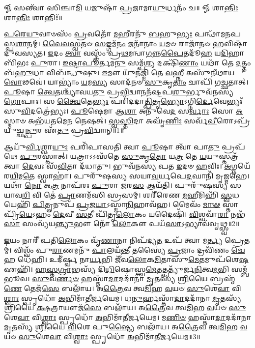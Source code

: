 \setcounter{anuvakam}{0}
𑍐 𑌸𑌨𑍍𑌤𑍍𑌵𑌾᳴ 𑌸𑌿𑌞𑍍𑌚𑌾\-\ul{𑌮𑌿} 𑌯𑌜𑍁𑌷𑌾᳴ \ul{𑌪𑍍𑌰}\-𑌜𑌾𑌮𑌾\-\ul{𑌯𑍁}\-𑌰𑍍𑌧𑌨𑌂᳴ 𑌚॥ 𑍐 𑌶𑌾\-\ul{𑌨𑍍𑌤𑌿𑌃} 𑌶𑌾\-\ul{𑌨𑍍𑌤𑌿𑌃} 𑌶𑌾𑌨𑍍𑌤𑌿𑌃᳴॥

\-\ul{𑌪}\-\-\ul{𑌰𑍇}\-\-\ul{𑌯𑍁}\-𑌵𑌾𑍞𑌸𑌂᳴ \ul{𑌪𑍍𑌰}\-𑌵𑌤𑍋᳴ \ul{𑌮}\-𑌹𑍀𑌰𑌨𑍁᳴ \ul{𑌬}\-𑌹𑍁\-\ul{𑌭𑍍𑌯𑌃} 𑌪𑌨𑍍𑌥𑌾᳴𑌮𑌨𑌪𑌸𑍍𑌪\-\ul{𑌶𑌾}\-𑌨𑌮𑍍। 
\-\ul{𑌵𑍈}\-\-\ul{𑌵}\-\-\ul{𑌸𑍍𑌵}\-𑌤𑍞 \ul{𑌸}\-𑌙𑍍𑌗𑌮᳴\-\ul{𑌨𑌂} 𑌜𑌨𑌾᳴𑌨𑌾𑌂 \ul{𑌯}\-𑌮𑍞 𑌰𑌾𑌜𑌾᳴𑌨𑍞 \ul{𑌹}\-𑌵𑌿𑌷𑌾᳴ 𑌦𑍁𑌵𑌸𑍍𑌯𑌤। 
\-\ul{𑌇}\-𑌦𑌂 \ul{𑌤𑍍𑌵𑌾} 𑌵𑌸𑍍𑌤𑍍𑌰𑌂᳴ 𑌪𑍍𑌰\-\ul{𑌥}\-𑌮𑌨𑍍𑌵𑌾\-\ul{𑌗}\-𑌨𑍍𑌨\-\ul{𑌪𑍈}\-𑌤𑌦𑍂᳴\-\ul{𑌹} 𑌯\-\ul{𑌦𑌿}\-𑌹𑌾𑌬𑌿᳴𑌭𑌃 \ul{𑌪𑍁}\-𑌰𑌾। 
\-\ul{𑌇}\-\-\ul{𑌷𑍍𑌟𑌾}\-\-\ul{𑌪𑍂}\-𑌰𑍍𑌤𑌮\-\ul{𑌨𑍁} 𑌸𑌮𑍍𑌪᳴\-\ul{𑌶𑍍𑌯} 𑌦𑌕𑍍𑌷𑌿᳴\-\ul{𑌣𑌾𑌂} 𑌯𑌥𑌾᳴ 𑌤𑍇 \ul{𑌦}\-𑌤𑍍𑌤𑌂 𑌬᳴\-\ul{𑌹𑍁}\-𑌧𑌾 𑌵𑌿𑌬᳴𑌨𑍍𑌧𑍁𑌷𑍁। 
\-\ul{𑌇}\-𑌮𑍗 𑌯𑍁᳴𑌨𑌜𑍍𑌮𑌿 𑌤𑍇 \ul{𑌵}\-𑌹𑍍𑌨𑍀 𑌅𑌸𑍁᳴𑌨𑍀𑌥𑌾𑌯 \ul{𑌵𑍋}\-𑌢𑌵𑍇॑। 
𑌯𑌾𑌭𑍍𑌯𑌾𑌂॑ \ul{𑌯}\-𑌮\-\ul{𑌸𑍍𑌯} 𑌸𑌾𑌦᳴𑌨𑍞 \ul{𑌸𑍁}\-𑌕𑍃\-\ul{𑌤𑌾𑌂} 𑌚𑌾𑌪𑌿᳴ 𑌗𑌚𑍍𑌛𑌤𑌾𑌤𑍍। 
\-\ul{𑌪𑍂}\-𑌷𑌾 \ul{𑌤𑍍𑌵𑍇}\-𑌤𑌶𑍍𑌚𑍍𑌯𑌾᳴𑌵𑌯\-\ul{𑌤𑍁} 𑌪𑍍𑌰\-\ul{𑌵𑌿}\-𑌦𑍍𑌵𑌾𑌨𑌨᳴𑌷𑍍𑌟𑌪\-\ul{𑌶𑍁}\-𑌰𑍍𑌭𑍁𑌵᳴𑌨𑌸𑍍𑌯 \ul{𑌗𑍋}\-𑌪𑌾𑌃। 
𑌸 \ul{𑌤𑍍𑌵𑍈}\-𑌤𑍇\-\ul{𑌭𑍍𑌯𑌃} 𑌪𑌰𑌿᳴𑌦𑌦𑌾\-\ul{𑌤𑍍𑌪𑌿}\-𑌤𑍃\-\ul{𑌭𑍍𑌯𑍋}\-𑌽𑌗𑍍𑌨𑌿\-\ul{𑌰𑍍𑌦𑍇}\-𑌵𑍇𑌭𑍍𑌯𑌃᳴ 𑌸𑍁\-\ul{𑌵𑌿}\-𑌦𑌤𑍍𑌰𑍇॑𑌭𑍍𑌯𑌃। 
\-\ul{𑌪𑍂}\-𑌷𑍇𑌮𑌾 𑌆\-\ul{𑌶𑌾} 𑌅𑌨𑍁᳴𑌵𑍇\-\ul{𑌦} 𑌸\-\ul{𑌰𑍍𑌵𑌾𑌃} 𑌸𑍋 \ul{𑌅}\-𑌸𑍍𑌮𑌾𑍞 𑌅𑌭᳴𑌯𑌤𑌮𑍇𑌨 𑌨𑍇𑌷𑌤𑍍। 
\-\ul{𑌸𑍍𑌵}\-\-\ul{𑌸𑍍𑌤𑌿}\-𑌦𑌾 𑌅𑌘𑍃᳴\-\ul{𑌣𑌿𑌃} 𑌸𑌰𑍍𑌵᳴\-\ul{𑌵𑍀}\-𑌰𑍋𑌽𑌪𑍍𑌰᳴𑌯𑍁𑌚𑍍𑌛\-\ul{𑌨𑍍𑌪𑍁}\-𑌰 𑌏᳴\-\ul{𑌤𑍁} 𑌪𑍍𑌰\-\ul{𑌵𑌿}\-𑌦𑍍𑌵𑌾𑌨𑍍॥1॥

𑌆𑌯𑍁᳴\-\ul{𑌰𑍍𑌵𑌿}\-𑌶𑍍𑌵𑌾\-\ul{𑌯𑍁𑌃} 𑌪𑌰𑌿᳴𑌪𑌾𑌸𑌤𑌿 𑌤𑍍𑌵𑌾 \ul{𑌪𑍂}\-𑌷𑌾 𑌤𑍍𑌵𑌾᳴ 𑌪𑌾\-\ul{𑌤𑍁} 𑌪𑍍𑌰𑌪᳴𑌥𑍇 \ul{𑌪𑍁}\-𑌰𑌸𑍍𑌤𑌾॑𑌤𑍍। 
𑌯𑌤𑍍𑌰𑌾𑌽𑌽𑌸᳴𑌤𑍇 \ul{𑌸𑍁}\-𑌕𑍃\-\ul{𑌤𑍋} 𑌯\-\ul{𑌤𑍍𑌰} 𑌤𑍇 \ul{𑌯}\-𑌯𑍁𑌸𑍍𑌤𑌤𑍍𑌰᳴ 𑌤𑍍𑌵𑌾 \ul{𑌦𑍇}\-𑌵𑌃 𑌸᳴\-\ul{𑌵𑌿}\-𑌤𑌾 𑌦᳴𑌧𑌾𑌤𑍁। 
𑌭𑍁𑌵᳴𑌨𑌸𑍍𑌯 𑌪𑌤 \ul{𑌇}\-𑌦𑍞 \ul{𑌹}\-𑌵𑌿𑌃। 
\-\ul{𑌅}\-𑌗𑍍𑌨𑌯𑍇᳴ 𑌰\-\ul{𑌯𑌿}\-𑌮\-\ul{𑌤𑍇} 𑌸𑍍𑌵𑌾𑌹𑌾॑। 
𑌪𑍁𑌰𑍁᳴𑌷𑌸𑍍𑌯 𑌸𑌯𑌾\-\ul{𑌵}\-𑌰𑍍𑌯𑌪𑍇\-\ul{𑌦}\-𑌘𑌾𑌨𑌿᳴ 𑌮𑍃𑌜𑍍𑌮𑌹𑍇। 
𑌯𑌥𑌾᳴ \ul{𑌨𑍋} 𑌅\-\ul{𑌤𑍍𑌰} 𑌨𑌾𑌪᳴𑌰𑌃 \ul{𑌪𑍁}\-𑌰𑌾 \ul{𑌜}\-𑌰\-\ul{𑌸} 𑌆𑌯᳴𑌤𑌿। 
𑌪𑍁𑌰𑍁᳴𑌷𑌸𑍍𑌯 𑌸𑌯𑌾𑌵\-\ul{𑌰𑌿} 𑌵𑌿 𑌤𑍇॑ \ul{𑌪𑍍𑌰𑌾}\-𑌣𑌮᳴𑌸𑌿 𑌸𑍍𑌰𑌸𑌮𑍍। 
𑌶𑌰𑍀᳴𑌰𑍇𑌣 \ul{𑌮}\-𑌹𑍀𑌮𑌿𑌹𑌿᳴ \ul{𑌸𑍍𑌵}\-𑌧𑌯𑍇𑌹𑌿᳴ \ul{𑌪𑌿}\-𑌤𑍄𑌨𑍁𑌪᳴ \ul{𑌪𑍍𑌰}\-𑌜\-\ul{𑌯𑌾}\-𑌽𑌸𑍍𑌮𑌾\-\ul{𑌨𑌿}\-𑌹𑌾𑌵᳴𑌹। 
𑌮𑍈𑌵𑌂᳴ \ul{𑌮𑌾}\-\-\ul{𑍟} 𑌸𑍍𑌤𑌾 𑌪𑍍𑌰𑌿᳴\-\ul{𑌯𑍇}\-𑌽𑌹𑌂 \ul{𑌦𑍇}\-𑌵𑍀 \ul{𑌸}\-𑌤𑍀 𑌪𑌿᳴𑌤𑍃\-\ul{𑌲𑍋}\-𑌕𑌂 𑌯𑌦𑍈𑌷𑌿᳴। 
\-\ul{𑌵𑌿}\-𑌶𑍍𑌵𑌵𑌾᳴\-\ul{𑌰𑌾} 𑌨𑌭᳴\-\ul{𑌸𑌾} 𑌸𑌂𑌵𑍍𑌯᳴𑌯\-\ul{𑌨𑍍𑌤𑍍𑌯𑍁}\-𑌭𑍗 𑌨𑍋᳴ \ul{𑌲𑍋}\-𑌕𑍗 𑌪𑌯᳴\-\ul{𑌸𑌾}\-𑌽𑌭𑍍𑌯𑌾𑌵᳴𑌵𑍃𑌥𑍍𑌸𑍍𑌵॥2॥

\-\ul{𑌇}\-𑌯𑌂 𑌨𑌾𑌰𑍀᳴ 𑌪𑌤𑌿\-\ul{𑌲𑍋}\-𑌕𑌂 𑌵𑍃᳴\-\ul{𑌣𑌾}\-𑌨𑌾 𑌨𑌿𑌪᳴𑌦𑍍𑌯\-\ul{𑌤} 𑌉𑌪᳴ 𑌤𑍍𑌵𑌾 𑌮\-\ul{𑌰𑍍𑌤𑍍𑌯} 𑌪𑍍𑌰𑍇𑌤𑌮𑍍॑। 
𑌵𑌿𑌶𑍍𑌵𑌂᳴ 𑌪𑍁\-\ul{𑌰𑌾}\-𑌣𑌮𑌨𑍁᳴ \ul{𑌪𑌾}\-𑌲𑌯᳴\-\ul{𑌨𑍍𑌤𑍀} 𑌤𑌸𑍍𑌯𑍈॑ \ul{𑌪𑍍𑌰}\-𑌜𑌾𑌂 𑌦𑍍𑌰𑌵𑌿᳴𑌣𑌂 \ul{𑌚𑍇}\-𑌹 𑌧𑍇᳴𑌹𑌿। 
𑌉𑌦𑍀॑𑌰𑍍𑌷𑍍𑌵 𑌨𑌾\-\ul{𑌰𑍍𑌯}\-𑌭𑌿 𑌜𑍀᳴𑌵\-\ul{𑌲𑍋}\-𑌕\-\ul{𑌮𑌿}\-𑌤𑌾𑌸𑍁᳴\-\ul{𑌮𑍇}\-𑌤𑌮𑍁𑌪᳴𑌶𑍇\-\ul{𑌷} 𑌏𑌹𑌿᳴। 
\-\ul{𑌹}\-\-\ul{𑌸𑍍𑌤}\-\-\ul{𑌗𑍍𑌰𑌾}\-𑌭𑌸𑍍𑌯᳴ 𑌦𑌿\-\ul{𑌧𑌿}\-𑌷𑍋𑌸𑍍𑌤𑍍𑌵\-\ul{𑌮𑍇}\-𑌤𑌤𑍍𑌪𑌤𑍍𑌯𑍁᳴𑌰𑍍𑌜\-\ul{𑌨𑌿}\-𑌤𑍍𑌵\-\ul{𑌮}\-𑌭𑌿 𑌸𑌮𑍍𑌬᳴𑌭𑍂𑌵। 
\-\ul{𑌸𑍁}\-𑌵\-\ul{𑌰𑍍𑌣}\-\-\ul{𑍞} 𑌹𑌸𑍍𑌤𑌾᳴\-\ul{𑌦𑌾}\-𑌦𑌦𑌾᳴𑌨𑌾 \ul{𑌮𑍃}\-𑌤𑌸𑍍𑌯᳴ \ul{𑌶𑍍𑌰𑌿}\-𑌯𑍈 𑌬𑍍𑌰𑌹𑍍𑌮᳴\-\ul{𑌣𑍇} 𑌤𑍇𑌜᳴\-\ul{𑌸𑍇} 𑌬𑌲𑌾᳴𑌯। 
𑌅\-\ul{𑌤𑍍𑌰𑍈}\-𑌵 𑌤𑍍𑌵\-\ul{𑌮𑌿}\-𑌹 \ul{𑌵}\-𑌯𑍞 \ul{𑌸𑍁}\-𑌶𑍇\-\ul{𑌵𑌾} 𑌵𑌿\-\ul{𑌶𑍍𑌵𑌾𑌃} 𑌸𑍍𑌪𑍃𑌧𑍋᳴ \ul{𑌅}\-𑌭𑌿𑌮𑌾᳴𑌤𑍀𑌰𑍍𑌜𑌯𑍇𑌮। 
𑌧\-\ul{𑌨𑍁}\-𑌰𑍍\mbox{}𑌹𑌸𑍍𑌤𑌾᳴\-\ul{𑌦𑌾}\-𑌦𑌦𑌾᳴𑌨𑌾 \ul{𑌮𑍃}\-𑌤𑌸𑍍𑌯᳴ \ul{𑌶𑍍𑌰𑌿}\-𑌯𑍈 \ul{𑌕𑍍𑌷}\-𑌤𑍍𑌰𑌾𑌯𑍗𑌜᳴\-\ul{𑌸𑍇} 𑌬𑌲𑌾᳴𑌯। 
𑌅\-\ul{𑌤𑍍𑌰𑍈}\-𑌵 𑌤𑍍𑌵\-\ul{𑌮𑌿}\-𑌹 \ul{𑌵}\-𑌯𑍞 \ul{𑌸𑍁}\-𑌶𑍇\-\ul{𑌵𑌾} 𑌵𑌿\-\ul{𑌶𑍍𑌵𑌾𑌃} 𑌸𑍍𑌪𑍃𑌧𑍋᳴ \ul{𑌅}\-𑌭𑌿𑌮𑌾᳴𑌤𑍀𑌰𑍍𑌜𑌯𑍇𑌮। 
𑌮\-\ul{𑌣𑌿}\-\-\ul{𑍞} 𑌹𑌸𑍍𑌤𑌾᳴\-\ul{𑌦𑌾}\-𑌦𑌦𑌾᳴𑌨𑌾 \ul{𑌮𑍃}\-𑌤𑌸𑍍𑌯᳴ \ul{𑌶𑍍𑌰𑌿}\-𑌯𑍈 \ul{𑌵𑌿}\-𑌶𑍇 𑌪𑍁\-\ul{𑌷𑍍𑌟𑍍𑌯𑍈} 𑌬𑌲𑌾᳴𑌯। 
𑌅\-\ul{𑌤𑍍𑌰𑍈}\-𑌵 𑌤𑍍𑌵\-\ul{𑌮𑌿}\-𑌹 \ul{𑌵}\-𑌯𑍞 \ul{𑌸𑍁}\-𑌶𑍇\-\ul{𑌵𑌾} 𑌵𑌿\-\ul{𑌶𑍍𑌵𑌾𑌃} 𑌸𑍍𑌪𑍃𑌧𑍋᳴ \ul{𑌅}\-𑌭𑌿𑌮𑌾᳴𑌤𑍀𑌰𑍍𑌜𑌯𑍇𑌮॥3॥

